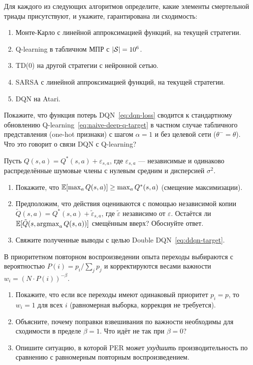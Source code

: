 \begin{exercise}
\label{ex:deadly-triad-identify}
Для каждого из следующих алгоритмов определите, какие элементы смертельной триады присутствуют, и укажите, гарантирована ли сходимость:
\begin{enumerate}
\item Монте-Карло с линейной аппроксимацией функций, на текущей стратегии.
\item Q-learning в табличном МПР с $|\mathcal{S}| = 10^6$.
\item TD(0) на другой стратегии с нейронной сетью.
\item SARSA с линейной аппроксимацией функций, на текущей стратегии.
\item DQN на Atari.
\end{enumerate}
\end{exercise}

\begin{exercise}
\label{ex:dqn-loss}
Покажите, что функция потерь DQN~\eqref{eq:dqn-loss} сводится к стандартному обновлению Q-learning~\eqref{eq:naive-deep-q-target} в частном случае табличного представления (one-hot признаки) с шагом $\alpha = 1$ и без целевой сети ($\theta^- = \theta$).  Что это говорит о связи DQN с Q-learning?
\end{exercise}

\begin{exercise}
\label{ex:double-dqn}
Пусть $Q(s, a) = Q^*(s, a) + \varepsilon_{s,a}$, где $\varepsilon_{s,a}$ --- независимые и одинаково распределённые шумовые члены с нулевым средним и дисперсией $\sigma^2$.
\begin{enumerate}
\item Покажите, что $\operatorname{\mathbb{E}}[\max_{a} Q(s, a)] \geq \max_a Q^*(s, a)$ (смещение максимизации).
\item Предположим, что действия оцениваются с помощью независимой копии $\tilde{Q}(s, a) = Q^*(s, a) + \tilde{\varepsilon}_{s,a}$, где $\tilde{\varepsilon}$ независимо от $\varepsilon$.  Остаётся ли $\operatorname{\mathbb{E}}[\tilde{Q}(s, \operatorname*{argmax}_a Q(s,a))]$ смещённым вверх?  Обоснуйте ответ.
\item Свяжите полученные выводы с целью Double DQN~\eqref{eq:ddqn-target}.
\end{enumerate}
\end{exercise}

\begin{exercise}
\label{ex:per-is-weights}
В приоритетном повторном воспроизведении опыта переходы выбираются с вероятностью
$P(i) = p_i / \sum_j p_j$ и корректируются весами важности
$w_i = (N \cdot P(i))^{-\beta}$.
\begin{enumerate}
\item Покажите, что если все переходы имеют одинаковый приоритет $p_i = p$, то $w_i = 1$ для всех $i$ (равномерная выборка, коррекция не требуется).
\item Объясните, почему поправки взвешивания по важности необходимы для сходимости в пределе $\beta = 1$.  Что идёт не так при $\beta = 0$?
\item Опишите ситуацию, в которой PER может \emph{ухудшить} производительность по сравнению с равномерным повторным воспроизведением.
\end{enumerate}
\end{exercise}

